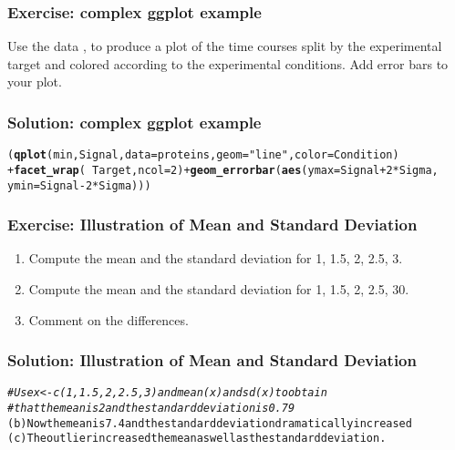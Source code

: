 \documentclass{article}\usepackage[]{graphicx}\usepackage[usenames,dvipsnames]{color}
\makeatletter
\newcommand{\hlnum}[1]{\textcolor[rgb]{0.686,0.059,0.569}{#1}}%
\newcommand{\hlstr}[1]{\textcolor[rgb]{0.192,0.494,0.8}{#1}}%
\newcommand{\hlcom}[1]{\textcolor[rgb]{0.678,0.584,0.686}{\textit{#1}}}%
\newcommand{\hlopt}[1]{\textcolor[rgb]{0,0,0}{#1}}%
\newcommand{\hlstd}[1]{\textcolor[rgb]{0.345,0.345,0.345}{#1}}%
\newcommand{\hlkwc}[1]{\textcolor[rgb]{0.333,0.667,0.333}{#1}}%
\newcommand{\hlkwd}[1]{\textcolor[rgb]{0.737,0.353,0.396}{\textbf{#1}}}%
\newenvironment{kframe}{%
 \def\at@end@of@kframe{}%
 \ifinner\ifhmode%
  \def\at@end@of@kframe{\end{minipage}}%
  \begin{minipage}{\columnwidth}%
 \fi\fi%
 \def\FrameCommand##1{\hskip\@totalleftmargin \hskip-\fboxsep
 \colorbox{shadecolor}{##1}\hskip-\fboxsep
     \hskip-\linewidth \hskip-\@totalleftmargin \hskip\columnwidth}%
 \MakeFramed {\advance\hsize-\width
   \@totalleftmargin\z@ \linewidth\hsize
   \@setminipage}}%
 {\par\unskip\endMakeFramed%
 \at@end@of@kframe}
\newenvironment{knitrout}{}{} %
\makeatother
\begin{document}
\subsubsection*{Exercise: complex ggplot example}
 
Use the data , to produce 
a plot of the time courses  split by the experimental 
target and colored according to the experimental 
conditions. Add error bars to your plot.



\subsubsection*{Solution: complex ggplot example}
\begin{knitrout}
\color{fgcolor}\begin{kframe}
\begin{alltt}
\hlstd{(}\hlkwd{qplot}\hlstd{(min, Signal,} \hlkwc{data} \hlstd{= proteins,} \hlkwc{geom} \hlstd{=} \hlstr{"line"}\hlstd{,} \hlkwc{color} \hlstd{= Condition)}
\hlopt{+} \hlkwd{facet_wrap}\hlstd{(} \hlopt{~} \hlstd{Target,} \hlkwc{ncol} \hlstd{=} \hlnum{2}\hlstd{)} \hlopt{+} \hlkwd{geom_errorbar}\hlstd{(}\hlkwd{aes}\hlstd{(}\hlkwc{ymax} \hlstd{= Signal}\hlopt{+}\hlnum{2}\hlopt{*}\hlstd{Sigma,}
                                                  \hlkwc{ymin} \hlstd{= Signal}\hlopt{-}\hlnum{2}\hlopt{*}\hlstd{Sigma)))}
\end{alltt}
\end{kframe}
\end{knitrout}


\subsubsection*{Exercise: Illustration of Mean and Standard Deviation}


\begin{enumerate}[label=(\emph{\alph*})] 
 \item Compute the mean and the standard deviation for 1, 1.5, 2, 2.5, 3.
\item Compute the mean and the standard deviation for 1, 1.5, 2, 2.5, 30.
 \item Comment on the differences.
\end{enumerate}

\subsubsection*{Solution:  Illustration of Mean and Standard Deviation}
\begin{knitrout}
\color{fgcolor}\begin{kframe}
\begin{alltt}
\hlcom{#Use x<- c(1,1.5,2,2.5,3) and mean(x) and sd(x) to obtain}
\hlcom{#that the mean is 2 and the standard deviation is 0.79}
(b) Now the mean is 7.4 and  the standard deviation dramatically increased 
(c) The outlier increased the mean as well as the standard deviation.
\end{alltt}
\end{kframe}
\end{knitrout}
\end{document}
